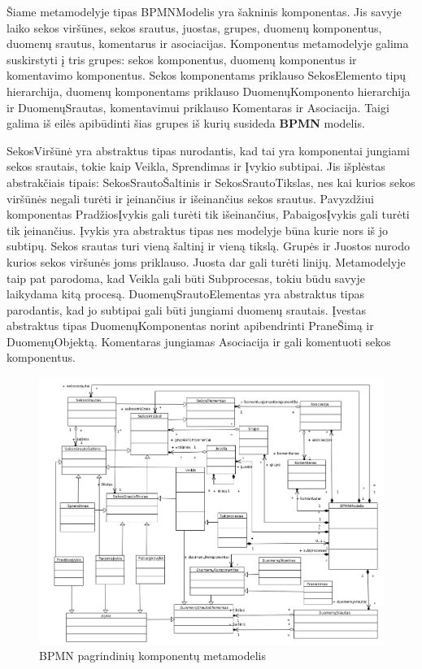 \documentclass{VUMIFInfBakalaurinis}
\begin{document}
Šiame metamodelyje tipas BPMNModelis yra šakninis komponentas. Jis savyje laiko sekos viršūnes, sekos srautus, juostas, grupes, duomenų komponentus, duomenų srautus, komentarus ir asociacijas.
Komponentus metamodelyje galima suskirstyti į tris grupes: sekos komponentus, duomenų komponentus ir komentavimo komponentus. Sekos komponentams priklauso SekosElemento tipų hierarchija, duomenų komponentams priklauso DuomenųKomponento hierarchija ir DuomenųSrautas, komentavimui priklauso Komentaras ir Asociacija. Taigi galima iš eilės apibūdinti šias grupes iš kurių susideda \textbf{BPMN} modelis.

SekosViršūnė yra abstraktus tipas nurodantis, kad tai yra komponentai jungiami sekos srautais, tokie kaip Veikla, Sprendimas ir Įvykio subtipai. Jis išplėstas abstrakčiais tipais: SekosSrautoŠaltinis ir SekosSrautoTikslas, nes kai kurios sekos viršūnės negali turėti ir įeinančius ir išeinančius sekos srautus. Pavyzdžiui komponentas PradžiosĮvykis gali turėti tik išeinančius, PabaigosĮvykis gali turėti tik įeinančius. Įvykis yra abstraktus tipas nes modelyje būna kurie nors iš jo subtipų. Sekos srautas turi vieną šaltinį ir vieną tikslą. Grupės ir Juostos nurodo kurios sekos viršunės joms priklauso. Juosta dar gali turėti linijų. Metamodelyje taip pat parodoma, kad Veikla gali būti Subprocesas, tokiu būdu savyje laikydama kitą procesą. DuomenųSrautoElementas yra abstraktus tipas parodantis, kad jo subtipai gali būti jungiami duomenų srautais. Įvestas abstraktus tipas DuomenųKomponentas norint apibendrinti PraneŠimą ir DuomenųObjektą. Komentaras jungiamas Asociacija ir gali komentuoti sekos komponentus.

\begin{figure}[H]
	\centering
	\includegraphics[width=\textwidth]{img/bpmn_metamodel}
	\caption{BPMN pagrindinių komponentų metamodelis}
	\label{img:bpmn_metamodel}
\end{figure}
\end{document}
